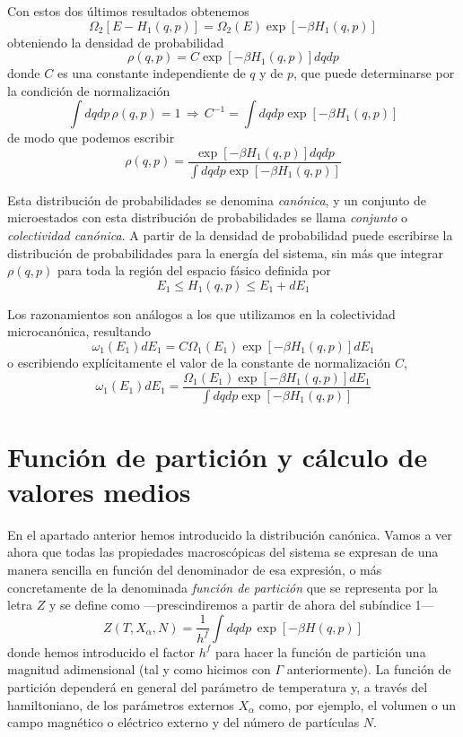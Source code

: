 Con estos dos últimos resultados obtenemos
\begin{equation}
	\Omega_2[E - H_1(q, p)] = \Omega_2(E)\exp \left[ -\beta H_1(q,p) \right]
\end{equation}
obteniendo la densidad de probabilidad
\begin{equation}
	\rho(q,p) = C \exp \left[ -\beta H_1(q,p) \right] dqdp
\end{equation}
donde $C$ es una constante independiente de $q$ y de $p$, que puede determinarse por la condición de normalización
$$\int dqdp \, \rho(q,p) = 1 \, \Rightarrow \, C^{-1} = \int dqdp \exp \left[ -\beta H_1(q,p) \right]$$
de modo que podemos escribir
\begin{equation}
	\rho(q,p) = \frac{\exp \left[ -\beta H_1(q,p) \right] dqdp}{\int dqdp \exp \left[ -\beta H_1(q,p) \right]}
\end{equation}

Esta distribución de probabilidades se denomina \emph{canónica}, y un conjunto de microestados con esta distribución de probabilidades se llama \emph{conjunto} o \emph{colectividad canónica}.
A partir de la densidad de probabilidad puede escribirse la distribución de probabilidades para la energía del sistema, sin más que integrar $\rho(q,p)$ para toda la región del espacio fásico definida por
$$E_1 \leq H_1(q, p) \leq E_1 + dE_1$$

Los razonamientos son análogos a los que utilizamos en la colectividad microcanónica, resultando
\begin{equation}
	\omega_1(E_1)dE_1 = C \Omega_1(E_1) \exp \left[ -\beta H_1(q,p) \right] dE_1
\end{equation}
o escribiendo explícitamente el valor de la constante de normalización $C$,
\begin{equation}
	\omega_1(E_1)dE_1 = \frac{\Omega_1(E_1) \exp \left[ -\beta H_1(q,p) \right] dE_1}{\int dqdp \exp \left[ -\beta H_1(q,p) \right]}
\end{equation}

\section{Función de partición y cálculo de valores medios}
En el apartado anterior hemos introducido la distribución canónica. Vamos a ver ahora que todas las propiedades macroscópicas del sistema se expresan de una manera sencilla en función del denominador de esa expresión, o más concretamente de la denominada \emph{función de partición} que se representa por la letra $Z$ y se define como ---prescindiremos a partir de ahora del subíndice 1---
\begin{equation}\label{eq:Zdef}
	Z(T, X_\alpha, N) = \frac{1}{h^f} \int dqdp \, \exp \left[ -\beta H(q,p) \right]
\end{equation}
donde hemos introducido el factor $h^f$ para hacer la función de partición una magnitud adimensional (tal y como hicimos con $\Gamma$ anteriormente). La función de partición dependerá en general del parámetro de temperatura y, a través del hamiltoniano, de los parámetros externos $X_\alpha$ como, por ejemplo, el volumen o un campo magnético o eléctrico externo y del número de partículas $N$.

